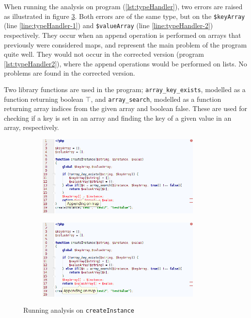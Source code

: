 When running the analysis on program (\ref{lst:typeHandler}), two errors are raised as illustrated in figure \ref{fig:typeHandlerScreenshot}. Both errors are of the same type, but on the \texttt{\$keyArray} (line \ref{line:typeHandler-1}) and \texttt{\$valueArray} (line \ref{line:typeHandler-2}) respectively. They occur when an append operation is performed on arrays that previously were considered maps, and represent the main problem of the program quite well. They would not occur in the corrected version (program \ref{lst:typeHandler2}), where the append operations would be performed on lists. No problems are found in the corrected version.

Two library functions are used in the program; \texttt{array\_key\_exists}, modelled as a function returning boolean $\top$, and \texttt{array\_search}, modelled as a function returning array indices from the given array and boolean false. These are used for checking if a key is set in an array and finding the key of a given value in an array, respectively.

\begin{figure}
\centering

\begin{subfigure}{\textwidth}
\centering
\includegraphics[width=0.9\textwidth]{chapters/caseStudy/screens/part1}
\label{fig:typeHandlerScreenshot-1}
\end{subfigure}

\begin{subfigure}{\textwidth}
\centering
\includegraphics[width=0.9\textwidth]{chapters/caseStudy/screens/part2}
\label{fig:typeHandlerScreenshot-2}
\end{subfigure}

\caption{Running analysis on \texttt{createInstance}}
\label{fig:typeHandlerScreenshot}
\end{figure}
